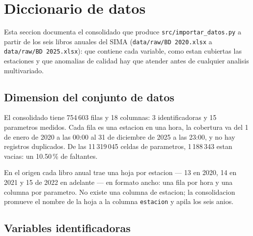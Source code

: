 %
%
%

\section{Diccionario de datos}\label{sec:diccionario}

Esta seccion documenta el consolidado que produce
\texttt{src/importar\_datos.py} a partir de los seis libros anuales del SIMA
(\texttt{data/raw/BD 2020.xlsx} a \texttt{data/raw/BD 2025.xlsx}): que contiene
cada variable, como estan cubiertas las estaciones y que anomalias de calidad
hay que atender antes de cualquier analisis multivariado.

\subsection{Dimension del conjunto de datos}\label{sec:dic:dimension}

El consolidado tiene 754\,603 filas y 18 columnas: 3 identificadoras y 15
parametros medidos. Cada fila es una estacion en una hora, la cobertura va del
1 de enero de 2020 a las 00:00 al 31 de diciembre de 2025 a las 23:00, y no hay
registros duplicados. De las 11\,319\,045 celdas de parametros, 1\,188\,343
estan vacias: un 10.50\,\% de faltantes.

En el origen cada libro anual trae una hoja por estacion --- 13 en 2020, 14 en
2021 y 15 de 2022 en adelante --- en formato ancho: una fila por hora y una
columna por parametro. No existe una columna de estacion; la consolidacion
promueve el nombre de la hoja a la columna \texttt{estacion} y apila los seis
anios.

\subsection{Variables identificadoras}\label{sec:dic:identificadoras}

